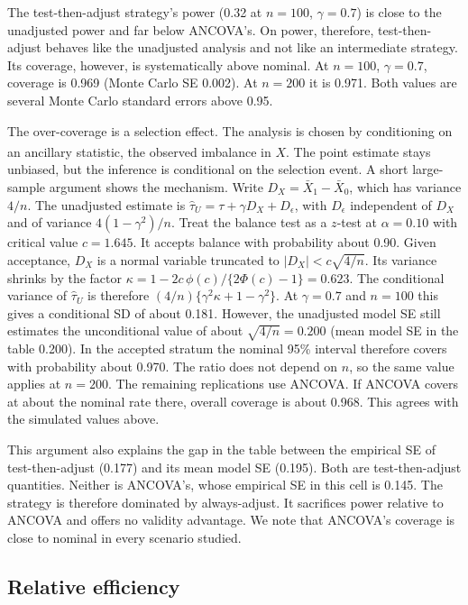 \documentclass[
  11pt,
]{article}
\begin{document}
The test-then-adjust strategy's power
(0.32 at \(n = 100\),
\(\gamma = 0.7\)) is close to the unadjusted power and far
below ANCOVA's. On power, therefore, test-then-adjust
behaves like the unadjusted analysis and not like an
intermediate strategy. Its coverage, however, is
systematically above nominal. At \(n = 100\),
\(\gamma = 0.7\), coverage is
0.969
(Monte Carlo SE 0.002).
At \(n = 200\) it is 0.971.
Both values are several Monte Carlo standard errors
above 0.95.

The over-coverage is a selection effect. The analysis
is chosen by conditioning on an ancillary statistic,
the observed imbalance in \(X\)\textsuperscript{}.
The point estimate stays unbiased, but the inference
is conditional on the selection event. A short
large-sample argument shows the mechanism. Write
\(D_X = \bar{X}_1 - \bar{X}_0\), which has variance
\(4/n\). The unadjusted estimate is
\(\hat{\tau}_U = \tau + \gamma D_X + D_\epsilon\), with
\(D_\epsilon\) independent of \(D_X\) and of variance
\(4(1 - \gamma^2)/n\). Treat the balance test as a
\(z\)-test at \(\alpha = 0.10\) with critical value
\(c = 1.645\). It accepts balance
with probability about
0.90. Given acceptance,
\(D_X\) is a normal variable truncated to
\(|D_X| < c\sqrt{4/n}\). Its variance shrinks by the
factor
\(\kappa = 1 - 2c\,\phi(c)/\{2\Phi(c) - 1\} =
0.623\). The conditional
variance of \(\hat{\tau}_U\) is therefore
\((4/n)\{\gamma^2\kappa + 1 - \gamma^2\}\). At
\(\gamma = 0.7\) and \(n = 100\) this gives a conditional
SD of about 0.181.
However, the unadjusted model SE still estimates the
unconditional value of about \(\sqrt{4/n} = 0.200\) (mean
model SE in the table
0.200). In the
accepted stratum the nominal 95\% interval therefore
covers with probability about
0.970. The ratio does not
depend on \(n\), so the same value applies at \(n = 200\).
The remaining replications use ANCOVA. If ANCOVA covers
at about the nominal rate there, overall coverage is
about 0.968. This agrees
with the simulated values above.

This argument also explains the gap in the table
between the empirical SE of test-then-adjust
(0.177) and its mean
model SE (0.195). Both
are test-then-adjust quantities. Neither is ANCOVA's,
whose empirical SE in this cell is
0.145. The strategy
is therefore dominated by always-adjust. It sacrifices
power relative to ANCOVA and offers no validity
advantage. We note that ANCOVA's coverage is close to
nominal in every scenario studied.

\subsection{Relative efficiency}\label{relative-efficiency}
\end{document}
